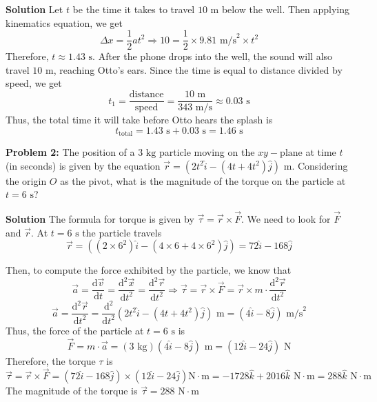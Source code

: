 \documentclass[12pt]{article}
\begin{document}
	\begin{mybox}{\textbf{Solution}}
		Let $t$ be the time it takes to travel $10\text{ m}$ below the well. Then applying kinematics equation, we get
		\[ \Delta x = \frac{1}{2}at^2 \Rightarrow 10 = \frac{1}{2}\times 9.81\text{ m/s}^2 \times t^2  \]
		Therefore, \( t \approx 1.43\text{ s} \). After the phone drops into the well, the sound will also travel \(10\text{ m} \), reaching Otto's ears. Since the time is equal to distance divided by speed, we get
		\[ t_1 = \frac{\text{distance}}{\text{speed}} = \frac{10\text{ m}}{343\text{ m/s}} \approx 0.03\text{ s}\]
		Thus, the total time it will take before Otto hears the splash is 
		\[ t_\text{total} = 1.43\text{ s} + 0.03\text{ s} = \boxed{1.46\text{ s}} \]
	\end{mybox}
	\medskip
	\noindent \textbf{Problem 2:} The position of a $3\text{ kg}$ particle moving on the
	\( xy-\text{plane} \) at time $t$  (in seconds) is given by the equation \( \vec{r} = \left( 2t^2 \hat{i} - \left( 4t+ 4t^2 \right) \hat{j} \right) \) m. Considering the origin $O$ as the pivot, what is the magnitude of the torque on the particle at \( t = 6\text{ s} \)?
	\begin{mybox}{\textbf{Solution}}
		The formula for torque is given by $\vec{\tau} = \vec{r} \times \vec{F} $. We need to look for $\vec{F}$ and $\vec{r}$. At \( t = 6\text{ s} \) the particle travels \[ \vec{r} = \left( (2 \times 6^2)\hat{i} - ( 4 \times 6 + 4 \times 6^2) \hat{j}    \right) = 72 \hat{i} - 168 \hat{j}  \]
		
		Then, to compute the force exhibited by the particle, we know that
		\[ \vec{a} = \dfrac{\mathrm{d}\vec{v}}{\mathrm{d}t} =  \dfrac{\mathrm{d^2}\vec{x}}{\mathrm{d}t^2} = \dfrac{\mathrm{d^2}\vec{r}}{\mathrm{d}t^2} \Rightarrow \vec{\tau} = \vec{r} \times \vec{F} = \vec{r} \times m \cdot \dfrac{\mathrm{d^2}\vec{r}}{\mathrm{d}t^2}  \] 
		\[\vec{a} = \dfrac{\mathrm{d^2}\vec{r}}{\mathrm{d}t^2} =  \dfrac{\mathrm{d^2}}{\mathrm{d}t^2} \left( 2t^2 \hat{i} - \left( 4t+ 4t^2 \right) \hat{j} \right)\text{ m} = \left( 4\hat{i} - 8\hat{j} \right)\text{ m/s}^2   \]
		Thus, the force of the particle at \( t = 6\text{ s} \) is 
		\[ \vec{F} = m \cdot \vec{a} = \left( 3\text{ kg} \right) \left( 4\hat{i} - 8\hat{j} \right)\text{ m} = \left( 12\hat{i} - 24\hat{j} \right)\text{ N} \]
		Therefore, the torque \(\tau \) is 
		\[ \vec{\tau} = \vec{r} \times \vec{F} = \left( 72 \hat{i} - 168 \hat{j} \right) \times \left(  12\hat{i} - 24\hat{j}  \right)\text{N}\cdot\text{m} = -1728 \hat{k} + 2016\hat{k} \text{ N}\cdot\text{m} = 288\hat{k} \text{ N}\cdot\text{m} \]
		The magnitude of the torque is \( \boxed{ \vec{\tau} = 288\text{ N} \cdot \text{m}  }\)
		
	\end{mybox}
	
	
\end{document}
